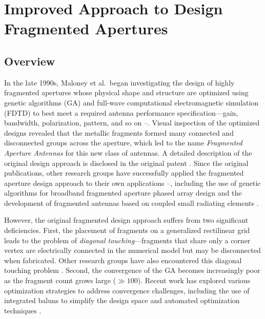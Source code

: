 \chapter{Improved Approach to Design Fragmented Apertures}

\section{Overview}

In the late 1990s, Maloney et al.\ began investigating the design of highly fragmented apertures whose physical shape and structure are optimized using genetic algorithms (GA) and full-wave computational electromagnetic simulation (FDTD) to best meet a required antenna performance specification---gain, bandwidth, polarization, pattern, and so on \cite{MaloneyKeslerHarms}--\cite{BalanisHB12}.  Visual inspection of the optimized designs revealed that the metallic fragments formed many connected and disconnected groups across the aperture, which led to the name \emph{Fragmented Aperture Antennas} for this new class of antennas.  A detailed description of the original design approach is disclosed in the original patent \cite{MaloneyFragPatent}.  Since the original publications, other research groups have successfully applied the fragmented aperture design approach to their own applications \cite{Herscovici}--\cite{EllgardtPersson}, including the use of genetic algorithms for broadband fragmented aperture phased array design \cite{Thors2005Broad-band} and the development of fragmented antennas based on coupled small radiating elements \cite{Barani2018Fragmented}.

However, the original fragmented design approach suffers from two significant deficiencies.  First, the placement of fragments on a generalized rectilinear grid leads to the problem of \emph{diagonal touching}---fragments that share only a corner vertex are electrically connected in the numerical model but may be disconnected when fabricated.  Other research groups have also encountered this diagonal touching problem \cite{EllgardtThesis}.  Second, the convergence of the GA becomes increasingly poor as the fragment count grows large ($\gg 100$).  Recent work has explored various optimization strategies to address convergence challenges, including the use of integrated baluns to simplify the design space \cite{Zang2019Optimum} and automated optimization techniques \cite{Li2019Automated}.

